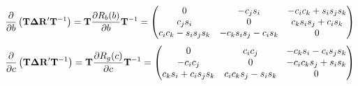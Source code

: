 \documentclass{article}
\def\vec#1{\ensuremath{\mathrm{\bf #1}}}
\def\partder#1#2{\ensuremath{\frac{\partial #1}{\partial #2}}}
\begin{document}
\[
 \partder{}{b} \left( \vec{T} \vec{\Delta R'} \vec{T}^{-1}   \right) = \vec{T} \partder{R_b(b)}{b} \vec{T}^{-1} =
\begin{pmatrix}
0 & -c_j  s_i & -c_i  c_k  + s_i  s_j  s_k \\
c_j  s_i & 0& c_k  s_i  s_j  + c_i  s_k \\
c_i  c_k  - s_i  s_j  s_k & -c_k  s_i  s_j  - c_i  s_k & 0
\end{pmatrix}
\]
\[
 \partder{}{c} \left( \vec{T} \vec{\Delta R'} \vec{T}^{-1}   \right) = \vec{T} \partder{R_g(c)}{c} \vec{T}^{-1} =
\begin{pmatrix}
0 &  c_i  c_j  &  -c_k  s_i  - c_i  s_j  s_k  \\ 
-c_i  c_j  &  0 &  -c_i  c_k  s_j  + s_i  s_k  \\
c_k  s_i  +  c_i  s_j  s_k  &  c_i  c_k  s_j  - s_i  s_k  &  0
\end{pmatrix}
\]
\end{document}
